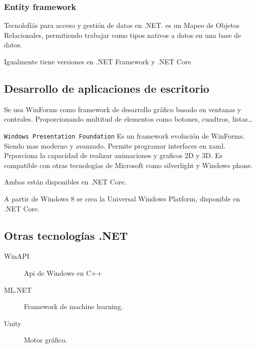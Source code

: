     \subsubsection{Entity framework}
        Tecnolofíás para acceso y gestión de datos en .NET. es un Mapeo de Objetos Relacionales, permitiendo trabajar como tipos nativos a datos en una base de datos.

        Igualmente tiene versiones en .NET Framework y .NET Core

\subsection{Desarrollo de aplicaciones de escritorio}
    Se usa WinForms como framework de desarrollo gráfico basado en ventanas y controles. Proporcionando multitud de elementos como botones, cuadtros, listas\dots

    \texttt{Windows Presentation Foundation} Es un framework evolución de WinForms. Siendo mas moderno y avanzado. Permite programar interfaces en xaml. Prporciona la capacidad de realizar animaciones y graficos 2D y 3D. Es compatible con otras tecnologías de Microsoft como silverlight y Windows phone.

    Ambas están disponibles en .NET Core.

    A partir de Windows 8 se crea la Universal Windows Platform, disponible en .NET Core.

\subsection{Otras tecnologías .NET}

\begin{description}
    \item[WinAPI] Api de Windows en C++
    \item[ML.NET] Framework de machine learning.
    \item[Unity] Motor gráfico.
\end{description}